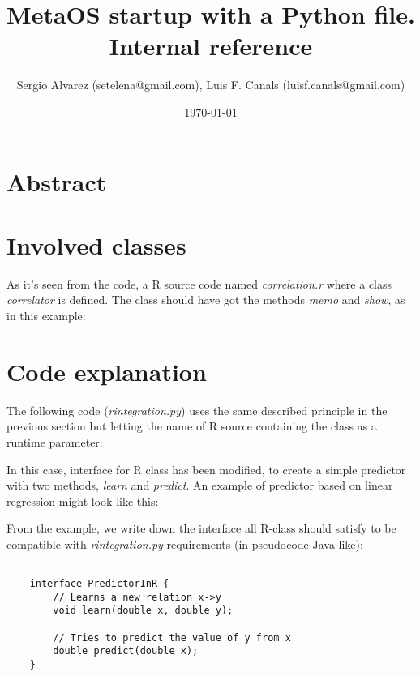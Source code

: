 \documentclass[11pt,a4paper]{article}
\title{MetaOS startup with a Python file. Internal reference}
\author{Sergio Alvarez (setelena@gmail.com),
    Luis F. Canals (luisf.canals@gmail.com)}
\begin{document}
\date{\today}
\maketitle


\section{Abstract}

\section{Involved classes}

\lstset{language=Java,frame=single,tabsize=2,basicstyle=\tiny}


As it's seen from the code, a R source code named \emph{correlation.r}
where a class \emph{correlator} is defined. The class should have got the
methods \emph{memo} and \emph{show}, as in this example:

\lstset{language=R,frame=single,tabsize=2,basicstyle=\tiny}




\section{Code explanation}

The following code (\emph{rintegration.py}) uses the same described principle 
in the previous section but letting the name of R source containing the 
class as a runtime parameter:

\lstset{language=Python,frame=single,tabsize=2,basicstyle=\tiny}


In this case, interface for R class has been modified, to create a simple
predictor with two methods, \emph{learn} and \emph{predict}. An example of
predictor based on linear regression might look like this:

From the example, we write down the interface all R-class should satisfy
to be compatible with \emph{rintegration.py} requirements (in pseudocode 
Java-like):

\lstset{language=Java,frame=single,tabsize=4,basicstyle=\tiny}
\begin{lstlisting}

    interface PredictorInR {
        // Learns a new relation x->y
        void learn(double x, double y);

        // Tries to predict the value of y from x
        double predict(double x);
    }

\end{lstlisting}
\label{PredictorInR}
\end{document}
